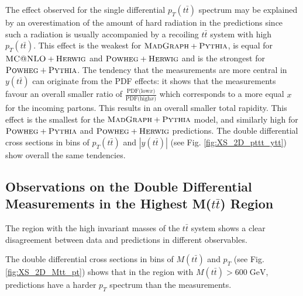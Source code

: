 The effect observed for the single differential $p_{T}(t\bar{t})$ spectrum may be explained by an overestimation of the amount of hard radiation
in the predictions since such a radiation is usually accompanied by a recoiling $t\bar{t}$ system with high $p_{T}(t\bar{t})$. This effect is the weakest 
for $\textsc{MadGraph}+\textsc{Pythia}$, is equal for $\textsc{MC@NLO}+\textsc{Herwig}$ and $\textsc{Powheg}+\textsc{Herwig}$ and is the strongest for
$\textsc{Powheg}+\textsc{Pythia}$. The tendency that the measurements are more central in $y(t\bar{t})$ can originate from the PDF effects: it shows that the 
measurements favour an overall smaller ratio of $\frac{\text{PDF(low}x)}{\text{PDF(high}x)}$ which corresponds to a more equal $x$ for the incoming partons. 
This results in an overall smaller total rapidity. 
This effect is the smallest for the $\textsc{MadGraph}+\textsc{Pythia}$ model, and similarly high for $\textsc{Powheg}+\textsc{Pythia}$ and
$\textsc{Powheg}+\textsc{Herwig}$ predictions. The double differential cross sections in bins of $p_{T}(t\bar{t})$ and $|y(t\bar{t})|$ (see Fig. \ref{fig:XS_2D_pttt_ytt}) 
show overall the same tendencies. 

\subsection{Observations on the Double Differential Measurements in the Highest M($t\bar{t}$) Region}\label{sec:ddxsec_discuss}

The region with the high invariant masses of the $t\bar{t}$ system shows a clear disagreement between data and predictions in different observables.

The double differential cross sections in bins of $M(t\bar{t})$ and $p_{T}$ (see Fig. \ref{fig:XS_2D_Mtt_pt}) shows that in the region with 
$M(t\bar{t}) > 600\;\text{GeV}$, predictions have a harder $p_{T}$ spectrum than the measurements. 

